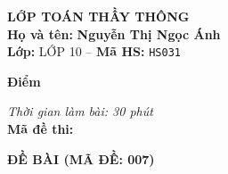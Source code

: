 \noindent
\begin{tcolorbox}[colback=white,colframe=black,arc=0mm,boxrule=0.8pt,top=4pt,bottom=4pt,left=6pt,right=6pt]
	\begin{minipage}[c]{0.44\textwidth}
		{\bfseries\large LỚP TOÁN THẦY THÔNG}\\[3pt]
		\textbf{Họ và tên:} \textbf{\large Nguyễn Thị Ngọc Ánh}\\[3pt]
		\textbf{Lớp:} LỚP 10 \quad -- \quad \textbf{Mã HS:} \texttt{HS031}
	\end{minipage}
	\hfill
	\begin{minipage}[c]{0.22\textwidth}
		\begin{tcolorbox}[colback=white,colframe=black,arc=0mm,boxrule=0.6pt,height=1.8cm,halign=center,valign=top,top=2pt]
			{\bfseries\normalsize Điểm}
		\end{tcolorbox}
	\end{minipage}
	\hfill
	\begin{minipage}[c]{0.30\textwidth}
		\raggedleft
		\textit{Thời gian làm bài: 30 phút}\\[4pt]
		\textbf{Mã đề thi:} 
	\end{minipage}
\end{tcolorbox}
\vspace{0.25cm}

\noindent\textbf{\large ĐỀ BÀI (MÃ ĐỀ: 007)}
\vspace{0.1cm}

